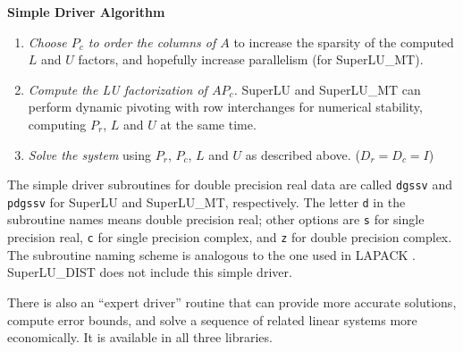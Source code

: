 \vspace*{.1in}
\noindent
{\bf Simple Driver Algorithm}
\begin{enumerate}
\item{\em Choose $P_c$ to order the columns of $A$} to increase the 
sparsity of the computed $L$ and $U$ factors, and hopefully increase 
parallelism (for SuperLU\_MT).
\item{\em Compute the LU factorization of $AP_c$.} SuperLU and SuperLU\_MT
can perform dynamic pivoting with row interchanges for numerical stability,
computing $P_r$, $L$ and $U$ at the same time.
\item{\em Solve the system} using $P_r$, $P_c$, $L$ and $U$ as described above.
    ($D_r = D_c = I$)
\end{enumerate}

The simple driver subroutines for double precision real data are called
{\tt dgssv} and {\tt pdgssv} for SuperLU and SuperLU\_MT, respectively.
The letter {\tt d} in the subroutine names means double precision real; 
other options are 
{\tt s} for single precision real,
{\tt c} for single precision complex, and
{\tt z} for double precision complex.
The subroutine naming scheme is analogous to the one used in 
LAPACK \cite{lapackmanual2}.
SuperLU\_DIST does not include this simple driver.

There is also an ``expert driver'' routine that can provide more accurate
solutions, compute error bounds, and solve a sequence of related linear systems
more economically. It is available in all three libraries.


